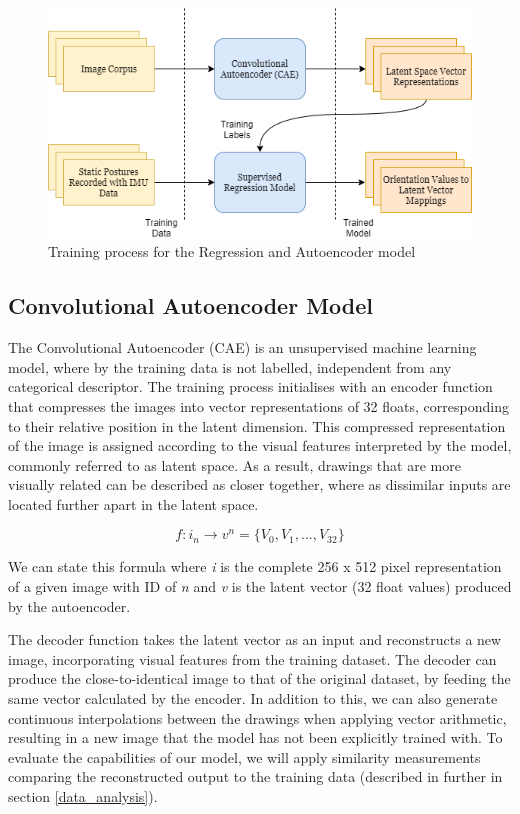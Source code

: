 \begin{figure}[ht]
    \centering
    \includegraphics[width=\textwidth]{Chapters/Figures/modi_dis/training_process.png}
    \caption{Training process for the Regression and Autoencoder model}
    \label{fig:training_fig}
\end{figure} 

\subsection{Convolutional Autoencoder Model}

The Convolutional Autoencoder (CAE) is an unsupervised machine learning model, where by the training data is not labelled, independent from any categorical descriptor. The training process initialises with an encoder function that compresses the images into vector representations of 32 floats, corresponding to their relative position in the latent dimension. This compressed representation of the image is assigned according to the visual features interpreted by the model, commonly referred to as latent space. As a result, drawings that are more visually related can be described as closer together, where as dissimilar inputs are located further apart in the latent space.

\[ f:i_n\xrightarrow{}v^n = \{V_0, V_1,... ,V_{32}\} \] 

We can state this formula where \textit{i} is the complete 256 x 512 pixel representation of a given image with ID of \textit{n} and \textit{v} is the latent vector (32 float values) produced by the autoencoder.

The decoder function takes the latent vector as an input and reconstructs a new image, incorporating visual features from the training dataset. The decoder can produce the close-to-identical image to that of the original dataset, by feeding the same vector calculated by the encoder. In addition to this, we can also generate continuous interpolations between the drawings when applying vector arithmetic, resulting in a new image that the model has not been explicitly trained with. To evaluate the capabilities of our model, we will apply similarity measurements comparing the reconstructed output to the training data (described in further in section \ref{data_analysis}).

